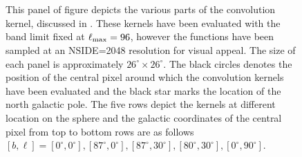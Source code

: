 \begin{figure}[!h]
\hspace{-2mm}
\hspace{-2mm}
\\[-2ex]
\hspace{-2mm}
\hspace{-2mm}
\hspace{-2mm}
\hspace{-2mm}
\hspace{-2mm}
\\[-2ex]
\hspace{-2mm}
\hspace{-2mm}
\hspace{-2mm}
\hspace{-2mm}
\hspace{-2mm}
\caption{This panel of figure depicts the various parts of the convolution kernel, discussed in . These kernels have been evaluated with the band limit fixed at $\ell_{\rm max}=96$, however the functions have been sampled at an NSIDE=2048 resolution for visual appeal. The size of each panel is approximately $26^{\circ} \times 26^{\circ}$. The black circles denotes the position of the central pixel around which the convolution kernels have been evaluated and the black star marks the location of the north galactic pole. The five rows depict the kernels at different location on the sphere and the galactic coordinates of the central pixel from top to bottom rows are as follows $[b,\ell] = [0^{\circ},0^{\circ}], [87^{\circ},0^{\circ}], [87^{\circ},30^{\circ}], [80^{\circ},30^{\circ}], [0^{\circ},90^{\circ}]$.}
\label{fig:vis_kernel}
 \end{figure}
